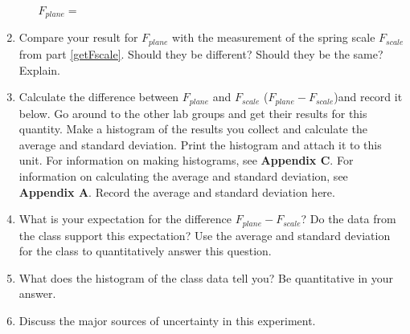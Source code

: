 \begin{enumerate}
\begin{enumerate}
\( F_{plane} =\)  \vspace{30mm}

\end{enumerate}

\item Compare your result for \( F_{plane} \) with the measurement of the spring
scale \( F_{scale} \) from part \ref{getFscale}. Should they be different? Should they be the same? Explain.
\vspace{30mm}


\item Calculate the difference between \( F_{plane} \) and \( F_{scale} \) (\( F_{plane} - F_{scale} \))and record it below.
Go around to the other lab groups and get their results for this quantity.
Make a histogram of the results you collect and calculate the average and standard deviation.
Print the histogram and attach it to this unit.
For information on making histograms, see \textbf{Appendix C}. For information on calculating the average and
standard deviation, see \textbf{Appendix A}. Record the average and standard deviation here.
\vspace{30mm}


\item What is your expectation for the difference \( F_{plane} - F_{scale} \)?
Do the data from the class support this expectation? 
Use the average and standard deviation for the class to quantitatively answer this question.
\vspace{15mm}

\item What does the histogram of the class data tell you? Be quantitative in your answer.
\vspace{15mm}

\item Discuss the major sources of uncertainty in this experiment.
\vspace{15mm}

\end{enumerate}
